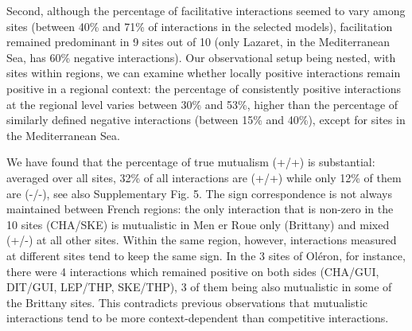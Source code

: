 \documentclass[9pt,twocolumn,twoside,lineno]{pnas-new}
\begin{document}
Second, although the percentage of facilitative interactions seemed
to vary among sites (between 40\% and 71\% of interactions in the
selected models), facilitation remained predominant in 9 sites out
of 10 (only Lazaret, in the Mediterranean Sea, has 60\% negative interactions).
Our observational setup being nested, with sites within regions, we
can examine whether locally positive interactions remain positive
in a regional context: the percentage of consistently positive interactions
at the regional level varies between 30\% and 53\%, higher than the
percentage of similarly defined negative interactions (between 15\%
and 40\%), except for sites in the Mediterranean Sea.

We have found that the percentage of true mutualism (+/+) is substantial:
averaged over all sites, 32\% of all interactions are (+/+) while
only 12\% of them are (-/-), see also Supplementary Fig. 5. The sign
correspondence is not always maintained between French regions: the
only interaction that is non-zero in the 10 sites (CHA/SKE) is mutualistic
in Men er Roue only (Brittany) and mixed (+/-) at all other sites.
Within the same region, however, interactions measured at different
sites tend to keep the same sign. In the 3 sites of Oléron, for instance,
there were 4 interactions which remained positive on both sides (CHA/GUI,
DIT/GUI, LEP/THP, SKE/THP), 3 of them being also mutualistic in some
of the Brittany sites. This contradicts previous observations that
mutualistic interactions tend to be more context-dependent than competitive
interactions\cite{chamberlain_how_2014}. 
\end{document}
